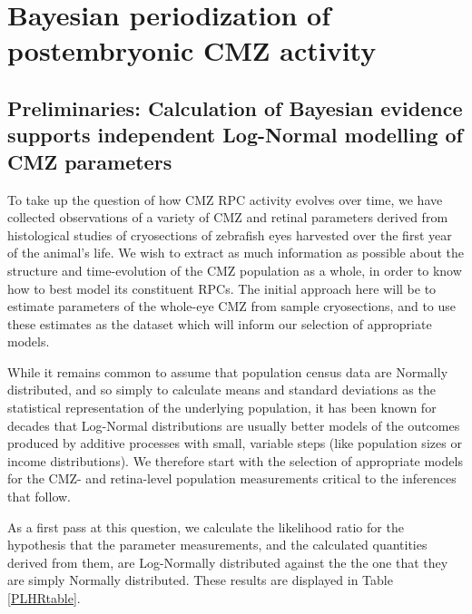 \chapter{Bayesian periodization of postembryonic CMZ activity}
\label{chap:CMZ}

\section{Preliminaries: Calculation of Bayesian evidence supports independent Log-Normal modelling of CMZ parameters}
To take up the question of how CMZ RPC activity evolves over time, we have collected observations of a variety of CMZ and retinal parameters derived from histological studies of cryosections of zebrafish eyes harvested over the first year of the animal's life. We wish to extract as much information as possible about the structure and time-evolution of the CMZ population as a whole, in order to know how to best model its constituent RPCs. The initial approach here will be to estimate parameters of the whole-eye CMZ from sample cryosections, and to use these estimates as the dataset which will inform our selection of appropriate models.

While it remains common to assume that population census data are Normally distributed, and so simply to calculate means and standard deviations as the statistical representation of the underlying population, it has been known for decades \cite{Heath1967} that Log-Normal distributions are usually better models of the outcomes produced by additive processes with small, variable steps (like population sizes or income distributions). We therefore start with the selection of appropriate models for the CMZ- and retina-level population measurements critical to the inferences that follow.

As a first pass at this question, we calculate the likelihood ratio for the hypothesis that the parameter measurements, and the calculated quantities derived from them, are Log-Normally distributed against the the one that they are simply Normally distributed. These results are displayed in Table \ref{PLHRtable}.

